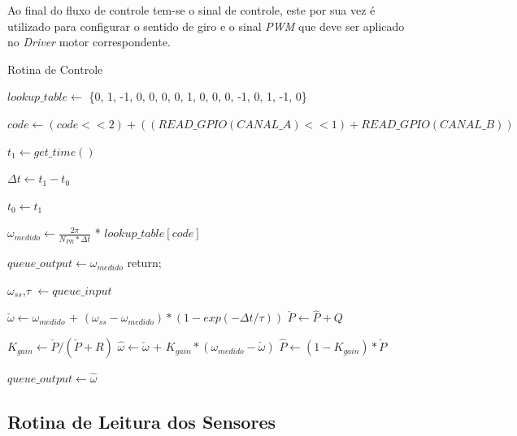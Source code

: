 Ao final do fluxo de controle tem-se o sinal de controle, este por sua vez é utilizado para configurar o sentido de giro e o sinal \emph{PWM} que deve ser aplicado no \emph{Driver} motor correspondente.

\begin{algorithm}
\caption{Rotina de Controle}
\label{alg:rotina_leitura_sensores}
\begin{algorithmic}[1]
  \State $lookup\_table \gets $ \{0, 1, -1, 0, 0, 0, 0, 1, 0, 0, 0, -1, 0, 1, -1, 0\}

  \State $code \gets (code << 2) + ((READ\_GPIO(CANAL\_A) << 1) + READ\_GPIO(CANAL\_B))$

  \State $t_1 \gets get\_time()$ 
  
  \State $\Delta{t} \gets  t_1 - t_0$
  
  \State $t_0 \gets t_1$ 
  
  \State $\omega_{medido} \gets \frac{2\pi}{N_{PR}*\Delta{t}}$ * $lookup\_table[code]$
  
   
    \State $queue\_output \gets \omega_{medido}$  
    \State return;
  \EndIf
  
  \State $\omega_{ss}$,$\tau$ $\gets  queue\_input$

  \State $\check{\omega} \gets \omega_{medido}$ + $( \omega_{ss} - \omega_{medido} ) * (1 - exp(-\Delta{t}/\tau))$
  \State $\check{P} \gets \hat{P} + Q$


  \State $K_{gain} \gets \check{P} / (\check{P} + R)$
  \State $\hat{\omega} \gets \check{\omega}$ + $K_{gain} * (\omega_{medido} - \check{\omega})$
  \State $\hat{P} \gets (1 - K_{gain}) * \check{P}$ 
  
  \State $queue\_output \gets \hat{\omega}$
\end{algorithmic}
\end{algorithm}

\subsection{Rotina de Leitura dos Sensores}

